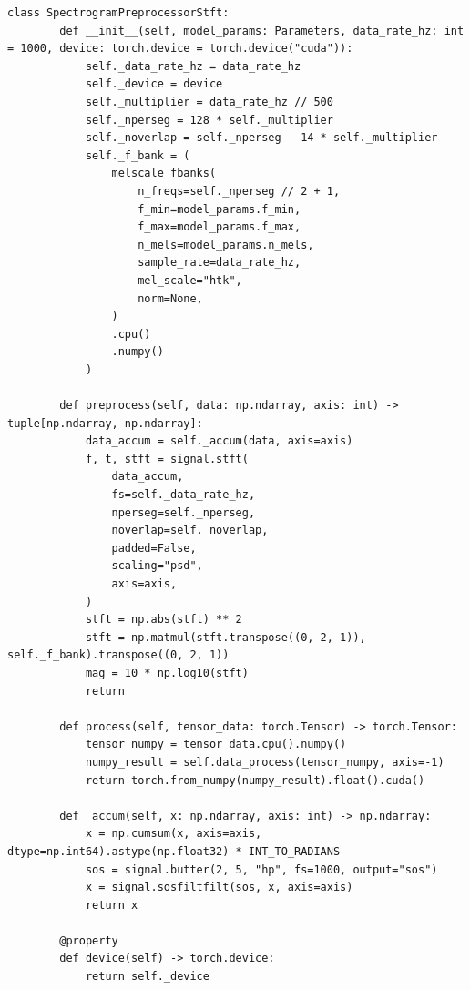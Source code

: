     \begin{lstlisting}[style=pythonstyle, caption={Preprocessing for conversion of raw phase data to spectrogram in the framework}, label=lst:stft_processing]
    class SpectrogramPreprocessorStft:
        def __init__(self, model_params: Parameters, data_rate_hz: int = 1000, device: torch.device = torch.device("cuda")):
            self._data_rate_hz = data_rate_hz
            self._device = device
            self._multiplier = data_rate_hz // 500
            self._nperseg = 128 * self._multiplier
            self._noverlap = self._nperseg - 14 * self._multiplier
            self._f_bank = (
                melscale_fbanks(
                    n_freqs=self._nperseg // 2 + 1,
                    f_min=model_params.f_min,
                    f_max=model_params.f_max,
                    n_mels=model_params.n_mels,
                    sample_rate=data_rate_hz,
                    mel_scale="htk",
                    norm=None,
                )
                .cpu()
                .numpy()
            )

        def preprocess(self, data: np.ndarray, axis: int) -> tuple[np.ndarray, np.ndarray]:
            data_accum = self._accum(data, axis=axis)
            f, t, stft = signal.stft(
                data_accum,
                fs=self._data_rate_hz,
                nperseg=self._nperseg,
                noverlap=self._noverlap,
                padded=False,
                scaling="psd",
                axis=axis,
            )
            stft = np.abs(stft) ** 2
            stft = np.matmul(stft.transpose((0, 2, 1)), self._f_bank).transpose((0, 2, 1))
            mag = 10 * np.log10(stft)
            return 

        def process(self, tensor_data: torch.Tensor) -> torch.Tensor:  
            tensor_numpy = tensor_data.cpu().numpy()
            numpy_result = self.data_process(tensor_numpy, axis=-1)
            return torch.from_numpy(numpy_result).float().cuda()  

        def _accum(self, x: np.ndarray, axis: int) -> np.ndarray:
            x = np.cumsum(x, axis=axis, dtype=np.int64).astype(np.float32) * INT_TO_RADIANS
            sos = signal.butter(2, 5, "hp", fs=1000, output="sos")
            x = signal.sosfiltfilt(sos, x, axis=axis)
            return x

        @property
        def device(self) -> torch.device:
            return self._device

    \end{lstlisting}

